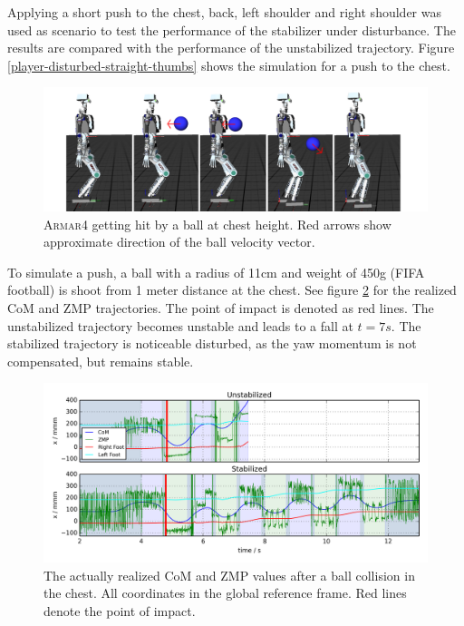 \documentclass[english,ngerman]{KITreprt}
\newcommand{\name}[1]{\textsc{#1}}
\begin{document}
Applying a short push to the chest, back, left shoulder and right
shoulder was used as scenario to test the performance of the stabilizer
under disturbance. The results are compared with the performance of the
unstabilized trajectory. Figure \ref{player-disturbed-straight-thumbs}
shows the simulation for a push to the chest.

\begin{figure}[H]
\vspace*{-1em}
\includegraphics[width=\textwidth,resolution=300]{images/disturbed_straight_thumbs.png}
\caption{\name{Armar4} getting hit by a ball at chest height. Red arrows show approximate direction of the ball velocity vector.}
\label{img:player-disturbed-straight-thumbs}
\end{figure}

To simulate a push, a ball with a radius of 11cm and weight of 450g
(FIFA football) is shoot from 1 meter distance at the chest. See figure
\ref{img:disturbed-front-straight-x} for the realized CoM and ZMP
trajectories. The point of impact is denoted as red lines. The
unstabilized trajectory becomes unstable and leads to a fall at
$t = 7s$. The stabilized trajectory is noticeable disturbed, as the yaw
momentum is not compensated, but remains stable.

\begin{figure}[hbt]
\vspace*{-1em}
\includegraphics[width=\textwidth,resolution=300]{images/disturbed_front_straight_x.png}
\caption{The actually realized CoM and ZMP values after a ball collision in the chest.
All coordinates in the global reference frame. Red lines denote the point of impact.}
\label{img:disturbed-front-straight-x}
\end{figure}
\end{document}
